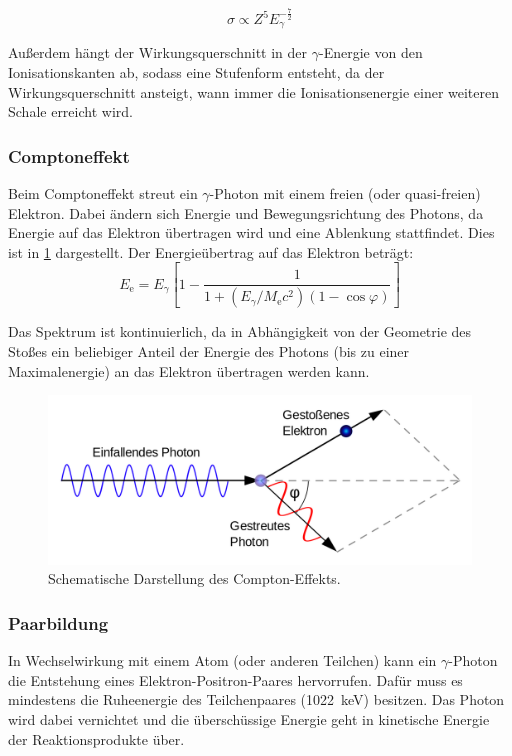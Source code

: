 \documentclass[
	a4paper,
	12pt,
	pagesize,
	ngerman
]{scrartcl}
\begin{document}
	\begin{equation}
		\label{eq_photo_wirk}
		\sigma \propto Z^5 E_\gamma^{-\frac{7}{2}}
	\end{equation}

	Außerdem hängt der Wirkungsquerschnitt in der $\gamma$-Energie von den Ionisationskanten ab, sodass eine Stufenform entsteht, da der Wirkungsquerschnitt ansteigt, wann immer die Ionisationsenergie einer weiteren Schale erreicht wird.

	\subsubsection{Comptoneffekt}

	Beim Comptoneffekt streut ein $\gamma$-Photon mit einem freien (oder quasi-freien) Elektron.
	Dabei ändern sich Energie und Bewegungsrichtung des Photons, da Energie auf das Elektron übertragen wird und eine Ablenkung stattfindet.
	Dies ist in \cref{fig_Compton} dargestellt.
	Der Energieübertrag auf das Elektron beträgt:
	\begin{equation}
		\label{eq_compton_energie}
		E_\text{e} = E_\gamma \left[ 1 - \frac{1}{1+(E_\gamma /M_\text{e} c^2)(1-\cos \varphi)} \right]
	\end{equation}

	Das Spektrum ist kontinuierlich, da in Abhängigkeit von der Geometrie des Stoßes ein beliebiger Anteil der Energie des Photons (bis zu einer Maximalenergie) an das Elektron übertragen werden kann.

	\begin{figure}[H]
			\includegraphics[width= 0.5 \linewidth]{charts/Comptonstreuung}
			\caption{
				Schematische Darstellung des Compton-Effekts.
				\cite{comptonwiki}
			}
			\label{fig_Compton}
	\end{figure}

	\subsubsection{Paarbildung}
	In Wechselwirkung mit einem Atom (oder anderen Teilchen) kann ein $\gamma$-Photon die Entstehung eines Elektron-Positron-Paares hervorrufen.
	Dafür muss es mindestens die Ruheenergie des Teilchenpaares (\SI{1022}{keV}) besitzen.
	Das Photon wird dabei vernichtet und die überschüssige Energie geht in kinetische Energie der Reaktionsprodukte über.
\end{document}
